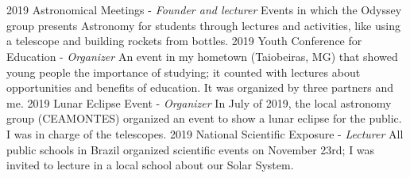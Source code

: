 \documentclass{cv}
\begin{document}
    \section*{}
        \begin{entrylist}
            \entry
                {2019}
                {Astronomical Meetings - {\textit{Founder and lecturer}}}
                {}
                {Events in which the Odyssey group presents Astronomy for students through lectures and activities, like using a telescope and building rockets from bottles.}
            \entry
                {2019}
                {Youth Conference for Education - {\textit{Organizer}}}
                {}
                {An event in my hometown (Taiobeiras, MG) that showed young people the importance of studying; it counted with lectures about opportunities and benefits of education. It was organized by three partners and me.}
            \entry
                {2019}
                {Lunar Eclipse Event - {\textit{Organizer}}}
                {}
                {In July of 2019, the local astronomy group (CEAMONTES) organized an event to show a lunar eclipse for the public. I was in charge of the telescopes.}
            \entry
                {2019}
                {National Scientific Exposure - {\textit{Lecturer}}}
                {}
                {All public schools in Brazil organized scientific events on November 23rd; I was invited to lecture in a local school about our Solar System.}
        \end{entrylist}
\end{document}
